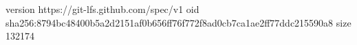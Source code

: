 version https://git-lfs.github.com/spec/v1
oid sha256:8794bc48400b5a2d2151af0b656ff76f772f8ad0cb7ca1ae2ff77ddc215590a8
size 132174
